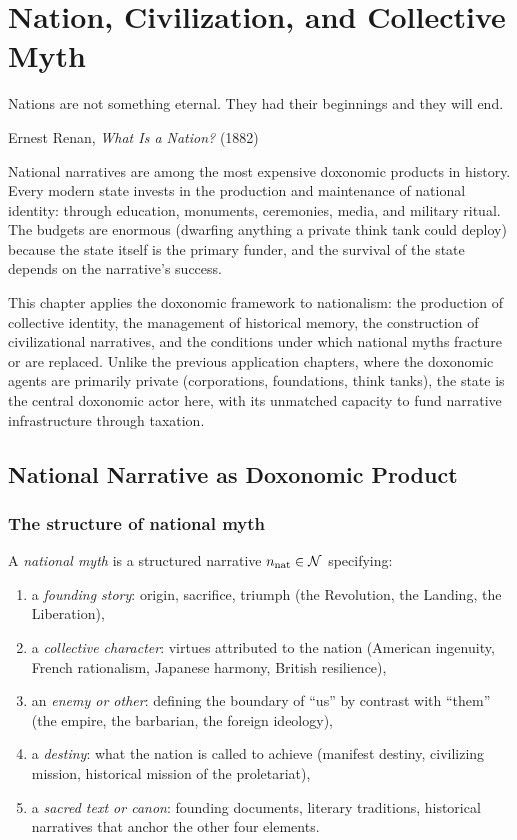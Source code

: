 \chapter{Nation, Civilization, and Collective Myth}
\label{ch:nation-myth}

\epigraph{Nations are not something eternal. They had their beginnings and they will end.}{Ernest Renan, \textit{What Is a Nation?} (1882)}

\noindent
National narratives are among the most expensive doxonomic products in history.
Every modern state invests in the production and maintenance of national identity: through education, monuments, ceremonies, media, and military ritual.
The budgets are enormous (dwarfing anything a private think tank could deploy) because the state itself is the primary funder, and the survival of the state depends on the narrative's success.

This chapter applies the doxonomic framework to nationalism: the production of collective identity, the management of historical memory, the construction of civilizational narratives, and the conditions under which national myths fracture or are replaced.
Unlike the previous application chapters, where the doxonomic agents are primarily private (corporations, foundations, think tanks), the state is the central doxonomic actor here, with its unmatched capacity to fund narrative infrastructure through taxation.

\section{National Narrative as Doxonomic Product}
\label{sec:ch27-national}

\subsection{The structure of national myth}

\begin{definition}
\label{def:national-myth}
A \emph{national myth} is a structured narrative $n_{\text{nat}} \in \mathcal{N}$ specifying:
\begin{enumerate}[nosep]
  \item a \emph{founding story}: origin, sacrifice, triumph (the Revolution, the Landing, the Liberation),
  \item a \emph{collective character}: virtues attributed to the nation (American ingenuity, French rationalism, Japanese harmony, British resilience),
  \item an \emph{enemy or other}: defining the boundary of ``us'' by contrast with ``them'' (the empire, the barbarian, the foreign ideology),
  \item a \emph{destiny}: what the nation is called to achieve (manifest destiny, civilizing mission, historical mission of the proletariat),
  \item a \emph{sacred text or canon}: founding documents, literary traditions, historical narratives that anchor the other four elements.
\end{enumerate}
\end{definition}

